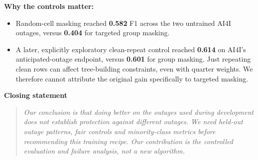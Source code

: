 \documentclass[11pt,a4paper]{article}
\newcommand{\say}[1]{\begin{quote}\itshape #1\end{quote}}
\begin{document}
\textbf{Why the controls matter:}
\begin{itemize}
\item Random-cell masking reached \textbf{0.582} F1 across the two untrained AI4I outages, versus \textbf{0.404} for targeted group masking.
\item A later, explicitly exploratory clean-repeat control reached \textbf{0.614} on AI4I's anticipated-outage endpoint, versus \textbf{0.601} for group masking. Just repeating clean rows can affect tree-building constraints, even with quarter weights. We therefore cannot attribute the original gain specifically to targeted masking.
\end{itemize}

\textbf{Closing statement}
\say{Our conclusion is that doing better on the outages used during development does not establish protection against different outages. We need held-out outage patterns, fair controls and minority-class metrics before recommending this training recipe. Our contribution is the controlled evaluation and failure analysis, not a new algorithm.}

\newpage
\end{document}
